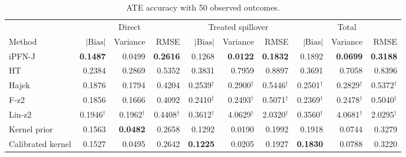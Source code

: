 \begin{table}[tb]
\centering
\caption{ATE accuracy with 50 observed outcomes.}
\begingroup\footnotesize
\setlength{\tabcolsep}{3pt}
\begin{tabular*}{\linewidth}{@{\extracolsep{\fill}}l*{9}{r}@{}}
\toprule
&\multicolumn{3}{c}{Direct}&\multicolumn{3}{c}{Treated spillover}&\multicolumn{3}{c}{Total}\\
\cmidrule(lr){2-4}\cmidrule(lr){5-7}\cmidrule(lr){8-10}
Method&$|\mathrm{Bias}|$&Variance&RMSE&$|\mathrm{Bias}|$&Variance&RMSE&$|\mathrm{Bias}|$&Variance&RMSE\\
\midrule
iPFN-J & \cellcolor{blue!24}\textbf{0.1487} & \cellcolor{blue!11}0.0499 & \cellcolor{blue!24}\textbf{0.2616} & \cellcolor{blue!17}0.1268 & \cellcolor{blue!24}\textbf{0.0122} & \cellcolor{blue!24}\textbf{0.1832} & \cellcolor{blue!17}0.1892 & \cellcolor{blue!24}\textbf{0.0699} & \cellcolor{blue!24}\textbf{0.3188} \\
HT & \cellcolor{blue!1}0.2384 & \cellcolor{blue!1}0.2869 & \cellcolor{blue!1}0.5352 & \cellcolor{blue!4}0.3831 & \cellcolor{blue!4}0.7959 & \cellcolor{blue!4}0.8897 & \cellcolor{blue!4}0.3691 & \cellcolor{blue!4}0.7058 & \cellcolor{blue!4}0.8396 \\
Hajek & \cellcolor{blue!2}0.1876 & \cellcolor{blue!2}0.1794 & \cellcolor{blue!2}0.4204 & 0.2539$^{\dagger}$ & 0.2900$^{\dagger}$ & 0.5446$^{\dagger}$ & 0.2501$^{\dagger}$ & 0.2829$^{\dagger}$ & 0.5372$^{\dagger}$ \\
F-z2 & \cellcolor{blue!4}0.1856 & \cellcolor{blue!4}0.1666 & \cellcolor{blue!4}0.4092 & 0.2410$^{\dagger}$ & 0.2493$^{\dagger}$ & 0.5071$^{\dagger}$ & 0.2369$^{\dagger}$ & 0.2478$^{\dagger}$ & 0.5040$^{\dagger}$ \\
Lin-z2 & 0.1946$^{\dagger}$ & 0.1962$^{\dagger}$ & 0.4408$^{\dagger}$ & 0.3612$^{\dagger}$ & 4.0629$^{\dagger}$ & 2.0320$^{\dagger}$ & 0.3560$^{\dagger}$ & 4.0681$^{\dagger}$ & 2.0295$^{\dagger}$ \\
Kernel prior & \cellcolor{blue!7}0.1563 & \cellcolor{blue!24}\textbf{0.0482} & \cellcolor{blue!7}0.2658 & \cellcolor{blue!7}0.1292 & \cellcolor{blue!11}0.0190 & \cellcolor{blue!7}0.1992 & \cellcolor{blue!7}0.1918 & \cellcolor{blue!11}0.0744 & \cellcolor{blue!7}0.3279 \\
Calibrated kernel & \cellcolor{blue!11}0.1527 & \cellcolor{blue!17}0.0495 & \cellcolor{blue!11}0.2642 & \cellcolor{blue!24}\textbf{0.1225} & \cellcolor{blue!7}0.0205 & \cellcolor{blue!11}0.1927 & \cellcolor{blue!24}\textbf{0.1830} & \cellcolor{blue!7}0.0788 & \cellcolor{blue!11}0.3220 \\

\end{tabular*}
\end{table}
